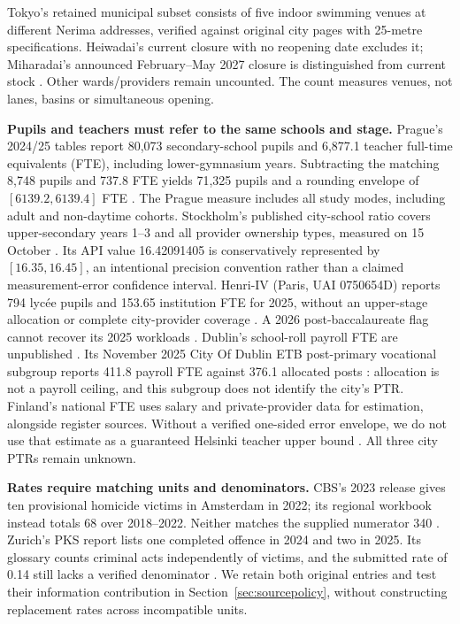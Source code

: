 Tokyo's retained municipal subset consists of five indoor swimming venues at different Nerima addresses, verified against original city pages with 25-metre specifications. Heiwadai's current closure with no reopening date excludes it; Miharadai's announced February--May 2027 closure is distinguished from current stock \cite{nerimapool,nerimaclose}. Other wards/providers remain uncounted. The count measures venues, not lanes, basins or simultaneous opening.

\textbf{Pupils and teachers must refer to the same schools and stage.}
Prague's 2024/25 tables report 80,073 secondary-school pupils and 6,877.1
teacher full-time equivalents (FTE), including lower-gymnasium years.
Subtracting the matching 8,748 pupils and 737.8 FTE yields 71,325 pupils and
a rounding envelope of $[6139.2,6139.4]$ FTE \cite{prague}. The Prague
measure includes all study modes, including adult and non-daytime cohorts.
Stockholm's
published city-school ratio covers upper-secondary years 1--3 and all provider
ownership types, measured on 15 October \cite{kolada}. Its API value
16.42091405 is conservatively represented by $[16.35,16.45]$, an intentional
precision convention rather than a claimed measurement-error confidence interval.
Henri-IV (Paris, UAI 0750654D) reports 794 lyc\'ee pupils and 153.65
institution FTE for 2025, without an upper-stage allocation or complete
city-provider coverage \cite{deppmatch}. A 2026 post-baccalaureate flag cannot
recover its 2025 workloads \cite{deppdirectory}.
Dublin's school-roll payroll FTE are unpublished \cite{irelandfte}.
Its November 2025 City Of Dublin ETB post-primary vocational subgroup reports
411.8 payroll FTE against 376.1 allocated posts \cite{irelandpayroll}:
allocation is not a payroll ceiling, and this subgroup does not identify the
city's PTR. Finland's national FTE uses salary and private-provider data for
estimation, alongside register sources. Without a verified one-sided error
envelope, we do not use that estimate as a guaranteed Helsinki teacher upper
bound \cite{finlandfte}. All three city PTRs remain unknown.

\textbf{Rates require matching units and denominators.}
CBS's 2023 release gives ten provisional homicide victims in Amsterdam in 2022;
its regional workbook instead totals 68 over 2018--2022. Neither matches the
supplied numerator 340 \cite{cbshomicide2022}. Zurich's PKS report lists one
completed offence in 2024 and two in 2025. Its glossary counts criminal acts
independently of victims, and the submitted rate of 0.14 still lacks a verified
denominator \cite{zhpks2025}. We retain both original entries and test their
information contribution in Section~\ref{sec:sourcepolicy}, without constructing
replacement rates across incompatible units.

